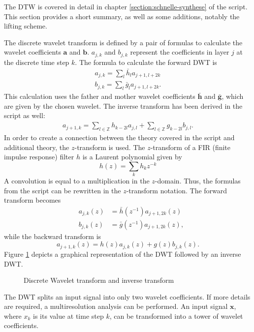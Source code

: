 \begin{refsection}
The DTW is covered in detail in chapter \ref{section:schnelle-synthese} of the script.
This section provides a short summary, as well as some additions, notably the lifting scheme.

The discrete wavelet transform is defined by a pair of formulas to calculate the wavelet coefficients $\bm a$ and $\bm b$.
$a_{j,k}$ and $b_{j,k}$ represent the coefficients in layer $j$ at the discrete time step $k$.
The formula to calculate the forward DWT is
\begin{align}
a_{j,k} = \sum_{l} \bar{h}_l a_{j+1,l+2k}
\\
b_{j,k} = \sum_{l} \bar{g}_l a_{j+1,l+2k} .
\end{align}
This calculation uses the father and mother wavelet coefficients $\bm{\bar h}$ and $\bm{\bar g}$, which are given by the chosen wavelet.
The inverse transform has been derived in the script as well: 
\begin{align}
a_{j+1,k} =
\sum_{l\in\mathbb Z}
h_{k-2l}
a_{j,l}
+
\sum_{l\in\mathbb Z}
g_{k-2l}
b_{j,l} .
\end{align}
In order to create a connection between the theory covered in the script and additional theory, the $z$-transform is used.
The $z$-transform of a FIR (finite impulse response) filter $h$ is a Laurent polynomial given by
\begin{equation}
h(z) = \sum_{k} h_k z^{-k}
\end{equation}
A convolution is equal to a multiplication in the $z$-domain.
Thus, the formulas from the script can be rewritten in the $z$-transform notation.
The forward transform becomes
\begin{align}
\quad a_{j,k}(z) &= \bar h(z^{-1}) a_{j+1,2k}(z) 
\\
\quad b_{j,k}(z) &= \bar g(z^{-1}) a_{j+1,2k}(z),
\end{align}
while the backward transform is
\begin{equation}
a_{j+1,k}(z) = h(z) a_{j,k}(z) + g(z) b_{j,k}(z).
\end{equation}
Figure \ref{fpga:fig:dwt} depicts a graphical representation of the DWT followed by an inverse DWT.
\begin{figure}
	\centering
	
	\caption{Discrete Wavelet transform and inverse transform}
	\label{fpga:fig:dwt}
\end{figure}
The DWT splits an input signal into only two wavelet coefficients.
If more details are required, a multiresolution analysis can be performed.
An input signal $\bm x$, where $x_k$ is its value at time step $k$, can be transformed into a tower of wavelet coefficients.

\end{refsection}

